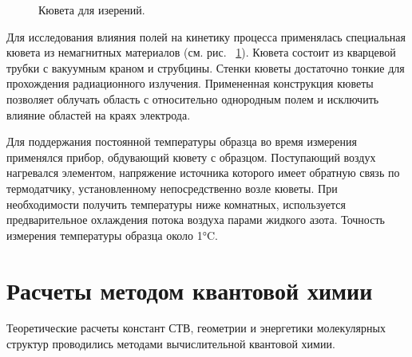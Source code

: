 \documentclass[14pt,titlepage]{extarticle}
\let\oldsection\section
\renewcommand{\section}{\newpage\oldsection}
\begin{document}
\begin{figure}
\caption{Кювета для изерений.}
\label{ris:kuvetta}
\end{figure}

Для исследования влияния полей на кинетику процесса применялась специальная кювета из немагнитных материалов (см. рис. ~\ref{ris:kuvetta}). Кювета состоит из кварцевой трубки с вакуумным краном и струбцины. Стенки кюветы достаточно тонкие для прохождения радиационного излучения. Примененная конструкция кюветы позволяет облучать область с относительно однородным полем и исключить влияние областей на краях электрода.

Для поддержания постоянной температуры образца во время измерения применялся прибор, обдувающий кювету с образцом. Поступающий воздух нагревался элементом, напряжение источника которого имеет обратную связь по термодатчику, установленному непосредственно возле кюветы. При необходимости получить температуры ниже комнатных, используется предварительное охлаждения потока воздуха парами жидкого азота. Точность измерения температуры образца около 1°C.

\oldsection{Расчеты методом квантовой химии}

Теоретические расчеты констант СТВ, геометрии и энергетики молекулярных структур проводились методами вычислительной квантовой химии.
\end{document}
